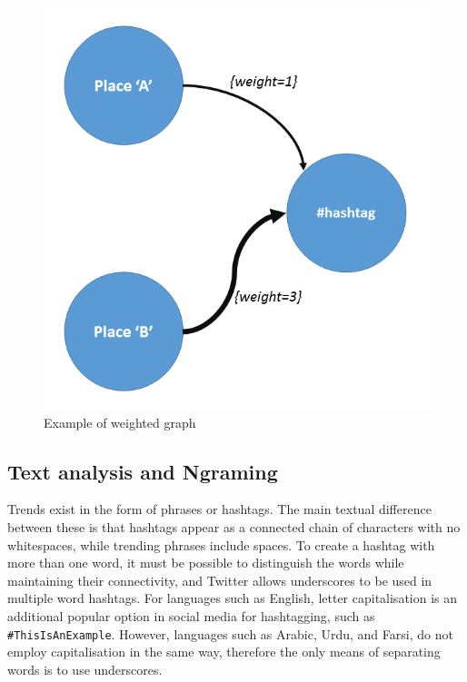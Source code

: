 \documentclass[conference]{IEEEtran}
\begin{document}


\begin{figure}[!ht] \centering
\includegraphics[width=\columnwidth]{images/w_graph.png}
\caption{Example of weighted graph}
\label{fig:w_graph}
\end{figure}


\subsection{Text analysis and Ngraming}

Trends exist in the form of phrases or hashtags. The main textual
difference between these is that hashtags appear as a connected chain
of characters with no whitespaces, while trending phrases include
spaces. To create a hashtag with more than one word, it must be
possible to distinguish the words while maintaining their
connectivity, and Twitter allows underscores to be used in multiple
word hashtags. For languages such as English, letter capitalisation is
an additional popular option in social media for hashtagging, such as
{\texttt{\#ThisIsAnExample}}. However, languages such as Arabic, Urdu,
and Farsi, do not employ capitalisation in the same way, therefore the
only means of separating words is to use underscores.
\end{document}

